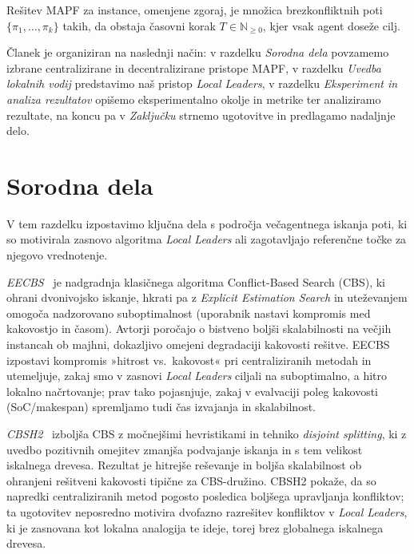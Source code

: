 \documentclass[sigconf,nonacm]{acmart}
\begin{document}
\vspace{0.5em}
\noindent 
Rešitev MAPF za instance, omenjene zgoraj, je množica brezkonfliktnih poti
 $\{\pi_1,\ldots,\pi_k\}$ takih, da obstaja časovni korak $T \in \mathbb{N}_{\ge 0}$, kjer vsak agent doseže cilj.~\cite{okumura2023lacam}

Članek je organiziran na naslednji način: v razdelku \textit{Sorodna dela} povzamemo izbrane
centralizirane in decentralizirane pristope MAPF, v razdelku \textit{Uvedba lokalnih vodij}
predstavimo naš pristop \textit{Local Leaders}, v razdelku \textit{Eksperiment in analiza rezultatov}
opišemo eksperimentalno okolje in metrike ter analiziramo rezultate, na koncu pa v
\textit{Zaključku} strnemo ugotovitve in predlagamo nadaljnje delo.
 
\section{Sorodna dela}

V tem razdelku izpostavimo ključna dela s področja večagentnega iskanja poti,
ki so motivirala zasnovo algoritma \textit{Local Leaders} ali zagotavljajo referenčne točke za
njegovo vrednotenje.

	\textit{EECBS}~\cite{li2021eecbs} je nadgradnja klasičnega algoritma Conflict-Based Search (CBS), ki ohrani dvonivojsko iskanje, hkrati pa z
    \textit{Explicit Estimation Search} in uteževanjem omogoča nadzorovano suboptimalnost (uporabnik nastavi 
    kompromis med kakovostjo in časom). Avtorji poročajo o bistveno boljši skalabilnosti na večjih instancah 
    ob majhni, dokazljivo omejeni degradaciji kakovosti rešitve. EECBS izpostavi kompromis »hitrost vs.\ kakovost« 
    pri centraliziranih metodah in utemeljuje, zakaj smo v zasnovi \textit{Local Leaders} ciljali na suboptimalno,
    a hitro lokalno načrtovanje; prav tako pojasnjuje, zakaj v evalvaciji poleg kakovosti (SoC/makespan) spremljamo tudi čas
    izvajanja in skalabilnost.


	\textit{CBSH2}~\cite{li2019disjoint} izboljša CBS z močnejšimi hevristikami in tehniko \textit{disjoint splitting}, 
    ki z uvedbo pozitivnih omejitev zmanjša podvajanje iskanja in s tem velikost iskalnega drevesa. Rezultat je 
    hitrejše reševanje in boljša skalabilnost ob ohranjeni rešitveni kakovosti tipične za CBS-družino. 
    CBSH2 pokaže, da so napredki centraliziranih metod pogosto posledica boljšega upravljanja
    konfliktov; ta ugotovitev neposredno motivira dvofazno razrešitev konfliktov v \textit{Local
    Leaders}, ki je zasnovana kot lokalna analogija te ideje, torej brez globalnega iskalnega drevesa.
\end{document}
